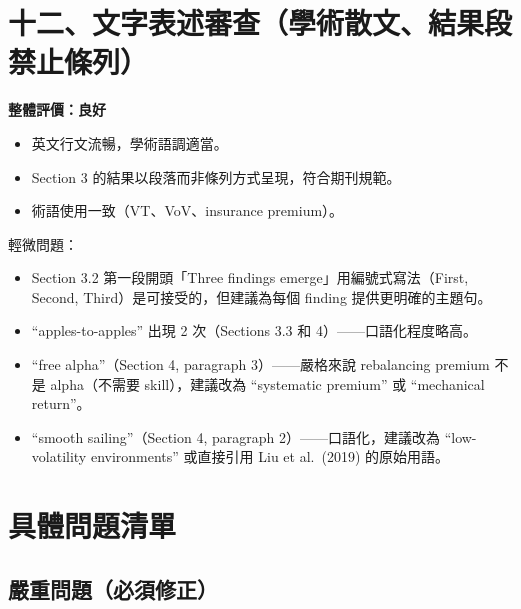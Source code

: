 \documentclass[12pt,a4paper]{article}
\begin{document}
\section*{十二、文字表述審查（學術散文、結果段禁止條列）}

\textcolor{okgreen}{\textbf{整體評價：良好}}

\begin{itemize}[leftmargin=2em]
\item 英文行文流暢，學術語調適當。
\item Section 3 的結果以段落而非條列方式呈現，符合期刊規範。
\item 術語使用一致（VT、VoV、insurance premium）。
\end{itemize}

輕微問題：

\begin{itemize}[leftmargin=2em]
\item Section 3.2 第一段開頭「Three findings emerge」用編號式寫法（First, Second, Third）是可接受的，但建議為每個 finding 提供更明確的主題句。
\item ``apples-to-apples'' 出現 2 次（Sections 3.3 和 4）——口語化程度略高。
\item ``free alpha''（Section 4, paragraph 3）——嚴格來說 rebalancing premium 不是 alpha（不需要 skill），建議改為 ``systematic premium'' 或 ``mechanical return''。
\item ``smooth sailing''（Section 4, paragraph 2）——口語化，建議改為 ``low-volatility environments'' 或直接引用 Liu et al.\ (2019) 的原始用語。
\end{itemize}

\section*{具體問題清單}

\subsection*{\textcolor{errorred}{嚴重問題（必須修正）}}
\end{document}
